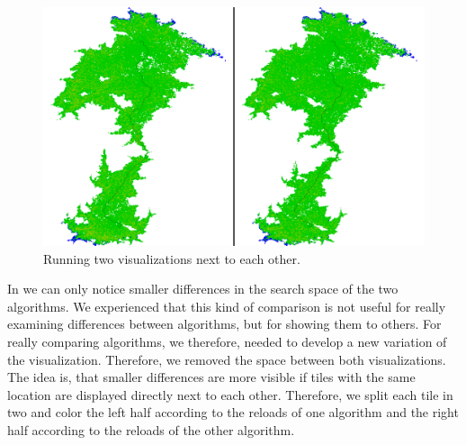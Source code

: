\documentclass
[
    paper = a4,
    pagesize,
    12 pt,
    twoside,                       %
    open = right,
    DIV = calc,
    BCOR = 0 mm,                   %
    bibtotoc
]
{scrbook}
\begin{document}
\begin{figure}
    \includegraphics[width=\textwidth]{Images/vis-compare-two.png}
\caption[]{Running two visualizations next to each other.}
\label{fig:two_visualization}
\end{figure}

In  we can only notice smaller differences in the search space of the two algorithms.
We experienced that this kind of comparison is not useful for really examining differences between algorithms, but for showing them to others.
For really comparing algorithms, we therefore, needed to develop a new variation of the visualization.
Therefore, we removed the space between both visualizations.
The idea is, that smaller differences are more visible if tiles with the same location are displayed directly next to each other.
Therefore, we split each tile in two and color the left half according to the reloads of one algorithm and the right half according to the reloads of the other algorithm.
\end{document}
